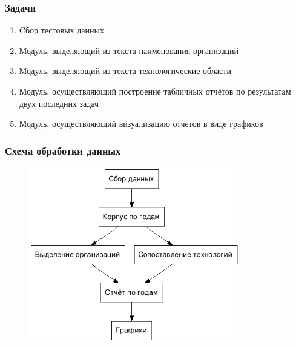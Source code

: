 \documentclass{beamer}
\begin{document}
\begin{frame}\frametitle{Задачи}

\begin{enumerate}
    \item Cбор тестовых данных
    \item Модуль, выделяющий из текста наименования организаций
    \item Модуль, выделяющий из текста технологические области
    \item Модуль, осуществляющий построение табличных отчётов по результатам двух последних задач
    \item Модуль, осуществляющий визуализацию отчётов в виде графиков
\end{enumerate}
\end{frame}

\begin{frame}\frametitle{Схема обработки данных}
\begin{figure}[ht]
\begin{center}
\includegraphics[height=3in]{pipeline.png}
\end{center}
\end{figure}
\end{frame}


\end{document}
